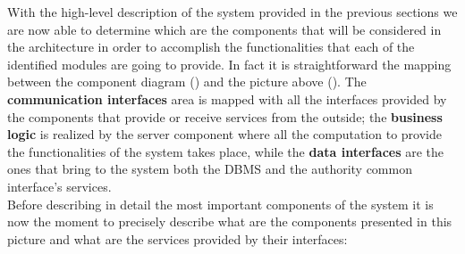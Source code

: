 		With the high-level description of the system provided in the previous sections we are now able to determine which are the components that will be considered in the architecture in order to accomplish the functionalities that each of the identified modules are going to provide. In fact it is straightforward the mapping between the component diagram () and the picture above (). The \textbf{communication interfaces} area is mapped with all the interfaces provided by the components that provide or receive services from the outside; the \textbf{business logic} is realized by the server component where all the computation to provide the functionalities of the system takes place, while the \textbf{data interfaces} are the ones that bring to the system both the DBMS and the authority common interface's services.\\
		
		Before describing in detail the most important components of the system it is now the moment to precisely describe what are the components presented in this picture and what are the services provided by their interfaces:
		
